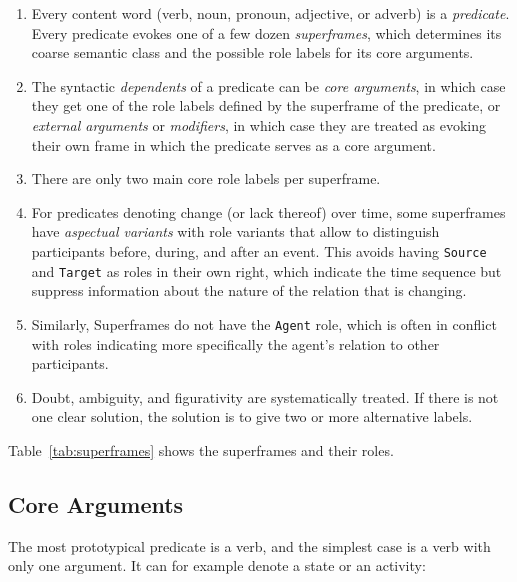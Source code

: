 \documentclass[a4paper]{article}
\begin{document}
\begin{enumerate}
    \item Every content word (verb, noun, pronoun, adjective, or adverb) is a
        \emph{predicate}. Every predicate evokes one of a few dozen
        \emph{superframes}, which determines its coarse semantic class and the
        possible role labels for its core arguments.
    \item The syntactic \emph{dependents} of a predicate can be
        \emph{core arguments}, in which case they get one of the role labels
        defined by the superframe of the predicate, or \emph{external
        arguments} or \emph{modifiers}, in which case they are treated as
        evoking their own frame in which the predicate serves as a core argument.
    \item There are only two main core role labels per superframe.
    \item For predicates denoting change (or lack thereof) over time,
        some superframes have \emph{aspectual variants} with role variants that
        allow to distinguish participants before, during, and after an event.
        This avoids having \texttt{Source} and \texttt{Target} as roles in
        their own right, which indicate the time sequence but suppress
        information about the nature of the relation that is changing.
    \item Similarly, Superframes do not have the \texttt{Agent} role, which is
        often in conflict with roles indicating more specifically the agent's
        relation to other participants.
    \item Doubt, ambiguity, and figurativity are systematically treated. If there
        is not one clear solution, the solution is to give two or more
        alternative labels.
\end{enumerate}

Table~\ref{tab:superframes} shows the superframes and their roles.

\subsection{Core Arguments}

The most prototypical predicate is a verb, and the simplest case is a verb with only one argument. It can for example denote a state or an activity:
\end{document}
